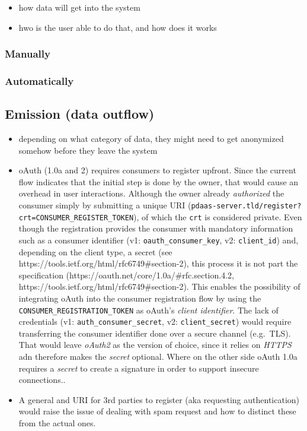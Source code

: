 \documentclass[12pt,english,a4paper,titlepage,cleardoublepage=empty,dottedtoc]{report}
\providecommand{\tightlist}{%
  \setlength{\itemsep}{0pt}\setlength{\parskip}{0pt}}
\begin{document}
\begin{itemize}
\tightlist
\item
  how data will get into the system
\item
  hwo is the user able to do that, and how does it works
\end{itemize}

\subsubsection{Manually}\label{manually}

\subsubsection{Automatically}\label{automatically}

\subsection{Emission (data outflow)}\label{emission-data-outflow}

\begin{itemize}
\item
  depending on what category of data, they might need to get anonymized
  somehow before they leave the system
\item
  oAuth (1.0a and 2) requires consumers to register upfront. Since the
  current flow indicates that the initial step is done by the owner,
  that would cause an overhead in user interactions. Although the owner
  already \emph{authorized} the consumer simply by submitting a unique
  URI
  (\texttt{pdaas-server.tld/register?crt=CONSUMER\_REGISTER\_TOKEN}), of
  which the \texttt{crt} is considered private. Even though the
  registration provides the consumer with mandatory information such as
  a consumer identifier (v1: \texttt{oauth\_consumer\_key}, v2:
  \texttt{client\_id}) and, depending on the client type, a secret (see
  https://tools.ietf.org/html/rfc6749\#section-2), this process it is
  not part the specification
  (https://oauth.net/core/1.0a/\#rfc.section.4.2,
  https://tools.ietf.org/html/rfc6749\#section-2). This enables the
  possibility of integrating oAuth into the consumer registration flow
  by using the \texttt{CONSUMER\_REGISTRATION\_TOKEN} as oAuth's
  \emph{client identifier}. The lack of credentials (v1:
  \texttt{auth\_consumer\_secret}, v2: \texttt{client\_secret}) would
  require transferring the consumer identifier done over a secure
  channel (e.g.~TLS). That would leave \emph{oAuth2} as the version of
  choice, since it relies on \emph{HTTPS} adn therefore makes the
  \emph{secret} optional. Where on the other side oAuth 1.0a requires a
  \emph{secret} to create a signature in order to support insecure
  connections..
\item
  A general and URI for 3rd parties to register (aka requesting
  authentication) would raise the issue of dealing with spam request and
  how to distinct these from the actual ones.
\end{itemize}
\end{document}
